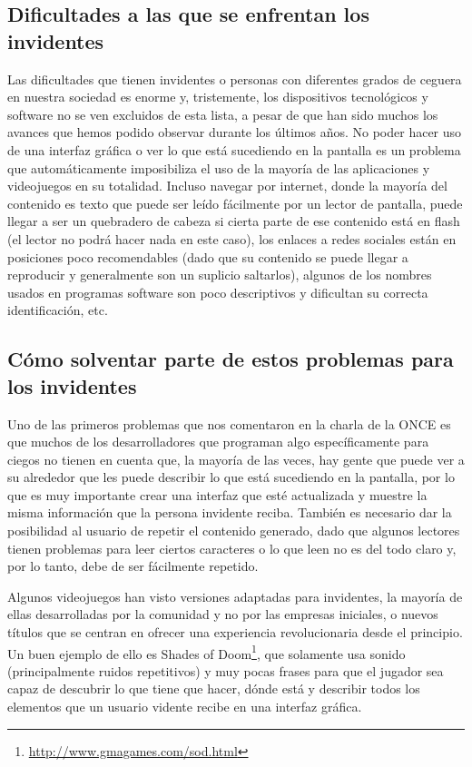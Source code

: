 \subsection{Dificultades a las que se enfrentan los invidentes}

Las dificultades que tienen invidentes o personas con diferentes grados de ceguera en nuestra sociedad es enorme y, tristemente, los dispositivos tecnológicos y software no se ven excluidos de esta lista, a pesar de que han sido muchos los avances que hemos podido observar durante los últimos años.
No poder hacer uso de una interfaz gráfica o ver lo que está sucediendo en la pantalla es un problema que automáticamente imposibiliza el uso de la mayoría de las aplicaciones y videojuegos en su totalidad. Incluso navegar por internet, donde la mayoría del contenido es texto que puede ser leído fácilmente por un lector de pantalla, puede llegar a ser un quebradero de cabeza si cierta parte de ese contenido está en flash (el lector no podrá hacer nada en este caso), los enlaces a redes sociales están en posiciones poco recomendables (dado que su contenido se puede llegar a reproducir y generalmente son un suplicio saltarlos), algunos de los nombres usados en programas software son poco descriptivos y dificultan su correcta identificación, etc.

\subsection{Cómo solventar parte de estos problemas para los invidentes}

Uno de las primeros problemas que nos comentaron en la charla de la ONCE es que muchos de los desarrolladores que programan algo específicamente para ciegos no tienen en cuenta que, la mayoría de las veces, hay gente que puede ver a su alrededor que les puede describir lo que está sucediendo en la pantalla, por lo que es muy importante crear una interfaz que esté actualizada y muestre la misma información que la persona invidente reciba.
También es necesario dar la posibilidad al usuario de repetir el contenido generado, dado que algunos lectores tienen problemas para leer ciertos caracteres o lo que leen no es del todo claro y, por lo tanto, debe de ser fácilmente repetido.

Algunos videojuegos han visto versiones adaptadas para invidentes, la mayoría de ellas desarrolladas por la comunidad y no por las empresas iniciales, o nuevos títulos que se centran en ofrecer una experiencia revolucionaria desde el principio. Un buen ejemplo de ello es Shades of Doom\footnote{\url{http://www.gmagames.com/sod.html}}, que solamente usa sonido (principalmente ruidos repetitivos) y muy pocas frases para que el jugador sea capaz de descubrir lo que tiene que hacer, dónde está y describir todos los elementos que un usuario vidente recibe en una interfaz gráfica.

